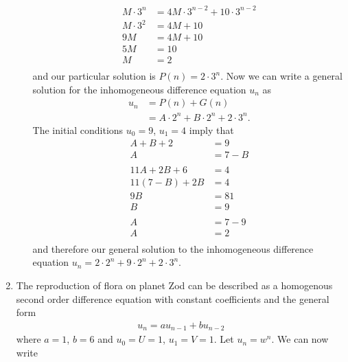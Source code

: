 \documentclass[10pt]{article}
\begin{document}
\begin{enumerate}
\begin{enumerate}
                \begin{align*}
                    M\cdot3^n &= 4M\cdot3^{n - 2} + 10 \cdot 3^{n - 2} \\
                    M\cdot3^2 &= 4M + 10 \\
                    9M &= 4M + 10 \\
                    5M &= 10 \\
                    M &= 2 \\
                \end{align*}
                and our particular solution is $P(n) = 2\cdot3^n$.
                Now we can write a general solution for the inhomogeneous
                difference equation $u_n$ as
                \begin{align*}
                    u_n &= P(n) + G(n) \\
                        &= A\cdot2^n + B\cdot2^n + 2\cdot3^n.
                \end{align*}
                The initial conditions $u_0 = 9$, $u_1 = 4$ imply that
                \begin{align*}
                    A + B + 2 &= 9 \\
                    A &= 7 - B  \\
                    \\
                    11A + 2B + 6 &= 4 \\
                    11(7 - B) + 2B &= 4 \\
                    9B &= 81 \\
                    B &= 9 \\
                    \\
                    A &= 7 - 9 \\
                    A &= 2 \\
                \end{align*}
                and therefore our general solution to the inhomogeneous
                difference equation $u_n = 2\cdot2^n + 9\cdot2^n + 2\cdot3^n$.
        \end{enumerate}
        \item The reproduction of flora on planet Zod can be described as a
            homogenous second order difference equation with constant
            coefficients and the general form 
            \begin{align*}
                u_n = au_{n - 1} + bu_{n - 2}
            \end{align*}
            where $a = 1$, $b = 6$ and $u_0 = U = 1$, $u_1 = V = 1$. Let $u_n = w^n$. We can now write

\end{enumerate}
\end{document}
